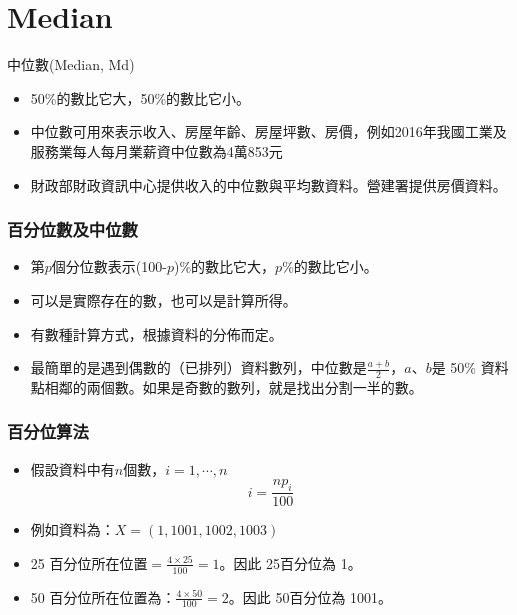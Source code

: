 \documentclass{beamer}
\begin{document}
\section{Median}
\begin{frame}{中位數(Median, Md)}
\begin{itemize}
\item 50\%的數比它大，50\%的數比它小。
\item 中位數可用來表示收入、房屋年齡、房屋坪數、房價，例如2016年我國工業及服務業每人每月業薪資中位數為4萬853元
\item 財政部財政資訊中心提供收入的中位數與平均數資料。營建署提供房價資料。
\end{itemize}
\end{frame}
\begin{frame}\frametitle{百分位數及中位數}
\begin{itemize}
\item 第$p$個分位數表示(100-$p$)\%的數比它大，$p$\%的數比它小。
\item 可以是實際存在的數，也可以是計算所得。
\item 有數種計算方式，根據資料的分佈而定。
\item 最簡單的是遇到偶數的（已排列）資料數列，中位數是$\frac{a+b}{2}$，$a$、$b$是 50\% 資料點相鄰的兩個數。如果是奇數的數列，就是找出分割一半的數。

\end{itemize}
\end{frame}
\begin{frame}\frametitle{百分位算法}
\begin{itemize}
\item 假設資料中有$n$個數，$i=1,\cdots,n$\\
\Large
\[i=\frac{np_{i}}{100}\]
\normalsize
\item 例如資料為：$X=(1, 1001, 1002, 1003)$
\item 25 百分位所在位置$=\frac{4\times 25}{100}=1$。因此 25百分位為 1。
\item 50 百分位所在位置為：$\frac{4\times 50}{100}=2$。因此 50百分位為 1001。

\end{itemize}
\end{frame}
\end{document}
